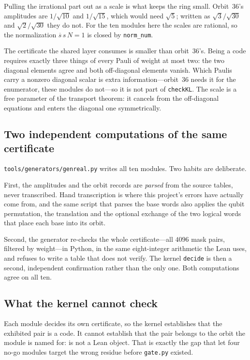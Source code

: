 \documentclass[11pt,a4paper]{article}
\newcommand{\lean}[1]{\texttt{#1}}
\theoremstyle{definition}
\begin{document}
Pulling the irrational part out as a scale is what keeps the ring small.
Orbit~36's amplitudes are $1/\sqrt{10}$ and $1/\sqrt{15}$, which would need
$\sqrt5$; written as $\sqrt3/\sqrt{30}$ and $\sqrt2/\sqrt{30}$ they do not.
For the ten modules here the scales are rational, so the normalization
$\overline{s}\,s\,N=1$ is closed by \lean{norm\_num}.

The certificate the shared layer consumes is smaller than orbit~36's. Being a
code requires exactly three things of every Pauli of weight at most two: the
two diagonal elements agree and both off-diagonal elements vanish. Which
Paulis carry a nonzero diagonal scalar is extra information---orbit~36 needs it
for the enumerator, these modules do not---so it is not part of
\lean{checkKL}. The scale is a free parameter of the transport theorem: it
cancels from the off-diagonal equations and enters the diagonal one
symmetrically.

\subsection{Two independent computations of the same certificate}

\lean{tools/generators/genreal.py} writes all ten modules. Two habits are
deliberate.

First, the amplitudes and the orbit records are \emph{parsed} from the source
tables, never transcribed. Hand transcription is where this project's errors
have actually come from, and the same script that parses the base words also
applies the qubit permutation, the translation and the optional exchange of the
two logical words that place each base into its orbit.

Second, the generator re-checks the whole certificate---all $4096$ mask pairs,
filtered by weight---in Python, in the same eight-integer arithmetic the Lean
uses, and refuses to write a table that does not verify. The kernel
\lean{decide} is then a second, independent confirmation rather than the only
one. Both computations agree on all ten.

\subsection{What the kernel cannot check}

Each module decides its own certificate, so the kernel establishes that the
exhibited pair is a code. It cannot establish that the pair belongs to the
orbit the module is named for:  is not a Lean object.
That is exactly the gap that let four no-go modules target the wrong residue
before \lean{gate.py} existed.
\end{document}
